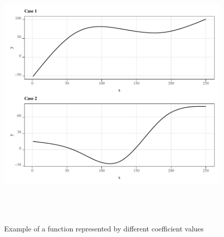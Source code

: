 \documentclass[
]{article}
\begin{document}
\begin{figure}[H]

{\centering \includegraphics[width=6in,height=500px,]{Figures/g_il_y} 

}

\caption{Example of a function represented by different coefficient values}\label{fig:ex-fx}
\end{figure}

\clearpage

  
\end{document}
